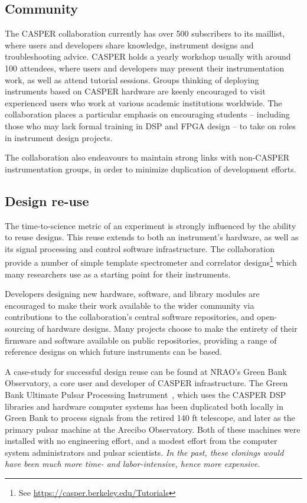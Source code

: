 \documentclass{ws-jai}
\begin{document}
\subsection{Community}
The CASPER collaboration currently has over 500 subscribers to its maillist, where users and developers share knowledge, instrument designs and troubleshooting advice. CASPER holds a yearly workshop usually with around 100 attendees, where users and developers may present their instrumentation work, as well as attend tutorial sessions. Groups thinking of deploying instruments based on CASPER hardware are keenly encouraged to visit experienced users who work at various academic institutions worldwide.
The collaboration places a particular emphasis on encouraging students -- including those who may lack formal training in DSP and FPGA design -- to take on roles in instrument design projects.

The collaboration also endeavours to maintain strong links with non-CASPER instrumentation groups, in order to minimize duplication of development efforts. 

\subsection{Design re-use}
The time-to-science metric of an experiment is strongly influenced by the ability to
reuse designs. This reuse extends to both an instrument's hardware, as well as its signal processing and control software infrastructure.
The collaboration provide a number of simple template spectrometer and correlator designs\footnote{See \url{https://casper.berkeley.edu/Tutorials}} which many researchers use as a starting point for their instruments.

Developers designing new hardware, software, and library modules are encouraged to make their work available to the wider community via contributions to the collaboration's central software repositories, and open-sourcing of hardware designs. Many projects choose to make the entirety of their firmware and software available on public repositories, providing a range of reference designs on which future instruments can be based. 

A case-study for successful design reuse can be found at NRAO's Green Bank Observatory, a core user and developer of CASPER infrastructure.
The Green Bank Ultimate Pulsar Processing
Instrument~\citep[GUPPI]{guppi}, which uses the CASPER DSP libraries and hardware
computer systems has been duplicated both locally in Green Bank to process signals
from the retired 140 ft telescope, and later as
the primary pulsar machine at the Arecibo Observatory.  Both of these
machines were installed with no engineering effort, and a modest
effort from the computer system administrators and pulsar scientists.
\emph{In the past, these clonings would have been much more time- and
  labor-intensive, hence more expensive.}
\end{document}
